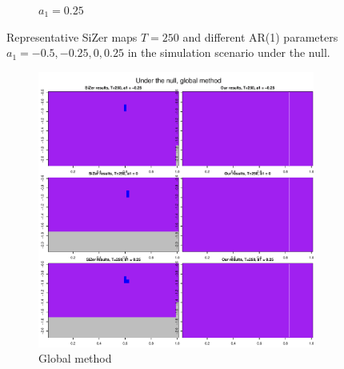 \documentclass[a4paper,12pt]{article}
\begin{document}
\begin{figure}[t!]
\begin{subfigure}[b]{0.475\textwidth}
\caption{$a_1 = 0.25$}
\end{subfigure}
\caption{Representative SiZer maps $T = 250$ and different AR(1) parameters $a_1 = -0.5, -0.25, 0, 0.25$ in the simulation scenario under the null.}\label{fig:Representative_SiZer_maps}
\end{figure}

\begin{figure}[t!]
\begin{subfigure}[b]{0.475\textwidth}
\includegraphics[width=\textwidth]{Plots/SiZer_comparison_under_null_global_T_250.pdf}
\caption{Global method}
\end{subfigure}\hspace{0.25cm}
\begin{subfigure}[b]{0.475\textwidth}

\end{subfigure}
\end{figure}
\end{document}
